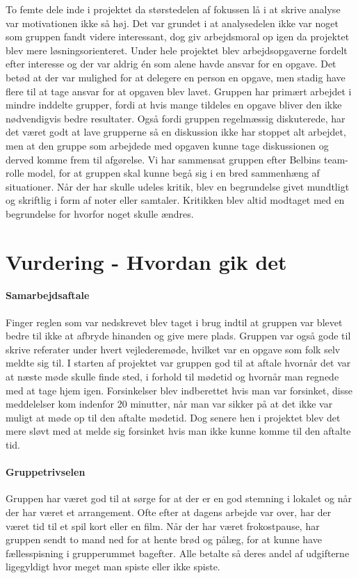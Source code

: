 To femte dele inde i projektet da størstedelen af fokussen lå i at skrive analyse var motivationen ikke så høj. Det var grundet i at analysedelen ikke var noget som gruppen fandt videre interessant, dog giv arbejdsmoral op igen da projektet blev mere løsningsorienteret. Under hele projektet blev arbejdsopgaverne fordelt efter interesse og der var aldrig én som alene havde ansvar for en opgave. Det betød at der var mulighed for at delegere en person en opgave, men stadig have flere til at tage ansvar for at opgaven blev lavet.
Gruppen har primært arbejdet i mindre inddelte grupper, fordi at hvis mange tildeles en opgave bliver den ikke nødvendigvis bedre resultater. Også fordi gruppen regelmæssig diskuterede, har det været godt at lave grupperne så en diskussion ikke har stoppet alt arbejdet, men at den gruppe som arbejdede med opgaven kunne tage diskussionen og derved komme frem til afgørelse. Vi har sammensat gruppen efter Belbins team-rolle model, for at gruppen skal kunne begå sig i en bred sammenhæng af situationer. Når der har skulle udeles kritik, blev en begrundelse givet mundtligt og skriftlig i form af noter eller samtaler. Kritikken blev altid modtaget med en begrundelse for hvorfor noget skulle ændres.

\section{Vurdering - Hvordan gik det}
\paragraph{Samarbejdsaftale}
Finger reglen som var nedskrevet blev taget i brug indtil at gruppen var blevet bedre til ikke at afbryde hinanden og give mere plads. Gruppen var også gode til skrive referater under hvert vejlederemøde, hvilket var en opgave som folk selv meldte sig til. I starten af projektet var gruppen god til at aftale hvornår det var at næste møde skulle finde sted, i forhold til mødetid og hvornår man regnede med at tage hjem igen. Forsinkelser blev indberettet hvis man var forsinket, disse meddelelser kom indenfor 20 minutter, når man var sikker på at det ikke var muligt at møde op til den aftalte mødetid. Dog senere hen i projektet blev det mere sløvt med at melde sig forsinket hvis man ikke kunne komme til den aftalte tid.

\paragraph{Gruppetrivselen}
Gruppen har været god til at sørge for at der er en god stemning i lokalet og når der har været et arrangement. Ofte efter at dagens arbejde var over, har der været tid til et spil kort eller en film. Når der har været frokostpause, har gruppen sendt to mand ned for at hente brød og pålæg, for at kunne have fællesspisning i grupperummet bagefter. Alle betalte så deres andel af udgifterne ligegyldigt hvor meget man spiste eller ikke spiste. 


